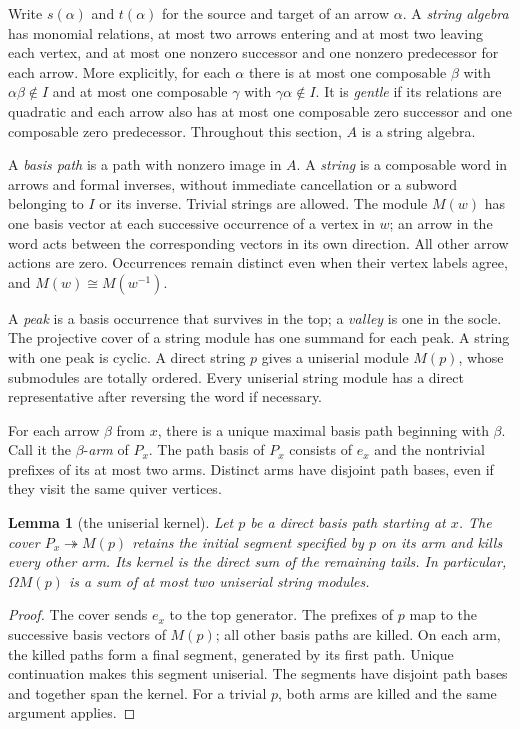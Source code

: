 \documentclass[reqno]{amsart}
\makeatletter
\def\subsection{\@startsection{subsection}{3}\z@{.8\linespacing\@plus.7\linespacing}{.5\linespacing}{\normalfont\bfseries \centering}}
\numberwithin{equation}{section}
\newtheorem{lemma}[theorem]{Lemma}
\theoremstyle{definition}
\theoremstyle{remark}
\newcommand{\Om}{\Omega}
\makeatother
\begin{document}
\subsection{Strings and projective arms}
Write \(s(\alpha)\) and \(t(\alpha)\) for the source and target of an arrow \(\alpha\). A \emph{string algebra} has monomial relations, at most two arrows entering and at most two leaving each vertex, and at most one nonzero successor and one nonzero predecessor for each arrow. More explicitly, for each \(\alpha\) there is at most one composable \(\beta\) with \(\alpha\beta\notin I\) and at most one composable \(\gamma\) with \(\gamma\alpha\notin I\). It is \emph{gentle} if its relations are quadratic and each arrow also has at most one composable zero successor and one composable zero predecessor. Throughout this section, \(A\) is a string algebra.

A \emph{basis path} is a path with nonzero image in \(A\). A \emph{string} is a composable word in arrows and formal inverses, without immediate cancellation or a subword belonging to \(I\) or its inverse. Trivial strings are allowed. The module \(M(w)\) has one basis vector at each successive occurrence of a vertex in \(w\); an arrow in the word acts between the corresponding vectors in its own direction. All other arrow actions are zero. Occurrences remain distinct even when their vertex labels agree, and \(M(w)\cong M(w^{-1})\).

A \emph{peak} is a basis occurrence that survives in the top; a \emph{valley} is one in the socle. The projective cover of a string module has one summand for each peak. A string with one peak is cyclic. A direct string \(p\) gives a uniserial module \(M(p)\), whose submodules are totally ordered. Every uniserial string module has a direct representative after reversing the word if necessary.

For each arrow \(\beta\) from \(x\), there is a unique maximal basis path beginning with \(\beta\). Call it the \(\beta\)-\emph{arm} of \(P_x\). The path basis of \(P_x\) consists of \(e_x\) and the nontrivial prefixes of its at most two arms. Distinct arms have disjoint path bases, even if they visit the same quiver vertices.

\begin{lemma}[the uniserial kernel]\label{lem:arms}
Let \(p\) be a direct basis path starting at \(x\). The cover \(P_x\twoheadrightarrow M(p)\) retains the initial segment specified by \(p\) on its arm and kills every other arm. Its kernel is the direct sum of the remaining tails. In particular, \(\Om M(p)\) is a sum of at most two uniserial string modules.
\end{lemma}
\begin{proof}
The cover sends \(e_x\) to the top generator. The prefixes of \(p\) map to the successive basis vectors of \(M(p)\); all other basis paths are killed. On each arm, the killed paths form a final segment, generated by its first path. Unique continuation makes this segment uniserial. The segments have disjoint path bases and together span the kernel. For a trivial \(p\), both arms are killed and the same argument applies.
\end{proof}
\end{document}
